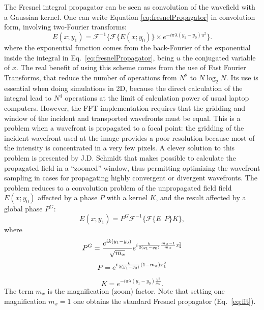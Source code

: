\documentclass[preprint]{iucr}              %
\begin{document}
The Fresnel integral propagator can be seen as convolution of the wavefield with a Gaussian kernel. 
One can write Equation \ref{eq:fresnelPropagator} in convolution form, involving two-Fourier transforms:
\begin{equation}\label{eq:fft}
E(x; y_1) = \mathcal{F}^{-1}\Big\{ \mathcal{F}\{E(x; y_0)\} \times e^{-i \pi \lambda (y_1-y_0) u^2} \Big\}.
\end{equation} 
where the exponential function comes from the back-Fourier of the exponential inside the integral in Eq.~\ref{eq:fresnelPropagator}, being $u$ the conjugated variable of $x$. 
The real benefit of using this scheme comes from the use of Fast Fourier Transforms, that reduce the number of operations from $N^2$ to $N \log_2 N$. Its use is essential when doing simulations in 2D, because the direct calculation of the integral lead to $N^4$ operations at the limit of calculation power of usual laptop computers. However, the FFT implementation requires that the gridding and window of the incident and transported wavefronts must be equal. This is a problem when a wavefront is propagated to a focal point: the gridding of the incident wavefront used at the image provides a poor resolution because most of the intensity is concentrated in a very few pixels. A clever solution to this problem is presented by J.D. Schmidt \cite{schmidt} that makes possible to calculate the propagated field in a ``zoomed'' window, thus permitting optimizing the wavefront sampling in cases for propagating highly convergent or divergent wavefronts. The problem reduces to a convolution problem of the unpropagated field field $E(x;y_0)$ affected by a phase $P$ with a kernel $K$, and the result affected by a global phase $P^G$: 
\begin{equation}
E(x; y_1) = P^G \mathcal{F}^{-1} \Big\{ \mathcal{F} \big\{ E~~P \big\} K \Big\},
\end{equation}
where
\begin{equation}
P^G =  \frac { e^{ik(y_1-y_0) }}{\sqrt{m_x} }e^{i \frac{k}{2 (y_1-y_0)} \frac{m_x - 1}{m_x}x_2^2}  \\
\end{equation}
\begin{equation}
P = e^{i \frac{k}{2(y_1-y_0)} (1-m_x)x_1^2 } \\
\end{equation}
\begin{equation}
K = e^{-i \pi \lambda (y_1-y_0) \frac{u^2}{m_x} }.
\end{equation}
The term $m_x$ is the magnification (zoom) factor. 
Note that setting one magnification $m_x=1$ one obtains the standard Fresnel propagator (Eq.~\ref{eq:fft}).
\end{document}
